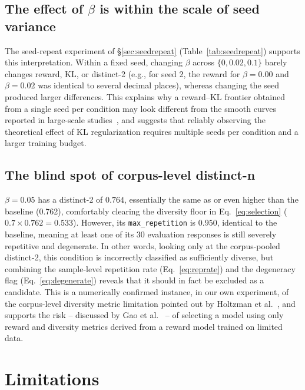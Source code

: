 \documentclass[conference]{IEEEtran}
\begin{document}
\subsection{The effect of $\beta$ is within the scale of seed variance}

The seed-repeat experiment of \S\ref{sec:seedrepeat}
(Table~\ref{tab:seedrepeat}) supports this interpretation. Within a
fixed seed, changing $\beta$ across $\{0, 0.02, 0.1\}$ barely changes
reward, KL, or distinct-2 (e.g., for seed 2, the reward for
$\beta{=}0.00$ and $\beta{=}0.02$ was identical to several decimal
places), whereas changing the seed produced larger differences. This
explains why a reward--KL frontier obtained from a single seed per
condition may look different from the smooth curves reported in
large-scale studies~\cite{ziegler2019finetuning,
stiennon2020learning}, and suggests that reliably observing the
theoretical effect of KL regularization requires multiple seeds per
condition and a larger training budget.

\subsection{The blind spot of corpus-level distinct-n}

$\beta{=}0.05$ has a distinct-2 of $0.764$, essentially the same as or
even higher than the baseline (0.762), comfortably clearing the
diversity floor in Eq.~\eqref{eq:selection} ($0.7\times 0.762 =
0.533$). However, its \texttt{max\_repetition} is $0.950$, identical to
the baseline, meaning at least one of its 30 evaluation responses is
still severely repetitive and degenerate. In other words, looking only
at the corpus-pooled distinct-2, this condition is incorrectly
classified as sufficiently diverse, but combining the sample-level
repetition rate
(Eq.~\eqref{eq:reprate}) and the degeneracy flag
(Eq.~\eqref{eq:degenerate}) reveals that it should in fact be excluded
as a candidate. This is a numerically confirmed instance, in our own
experiment, of the corpus-level diversity metric limitation pointed
out by Holtzman et al.~\cite{holtzman2020curious}, and supports the
risk -- discussed by Gao et al.~\cite{gao2023scaling} -- of selecting
a model using only reward and diversity metrics derived from a
reward model trained on limited data.

\section{Limitations}
\end{document}
